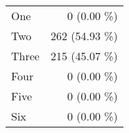 \begin{tabular}{ l  r }
One & 0 (0.00 \%)\\
Two & 262 (54.93 \%)\\
Three & 215 (45.07 \%)\\
Four & 0 (0.00 \%)\\
Five & 0 (0.00 \%)\\
Six & 0 (0.00 \%)\\
\end{tabular}